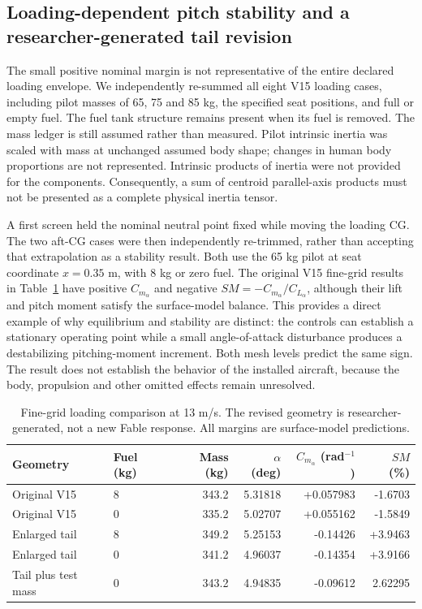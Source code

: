 \subsection{Loading-dependent pitch stability and a researcher-generated tail revision}
\label{sec:tail-loading-revision}

The small positive nominal margin is not representative of the entire declared
loading envelope. We independently re-summed all eight V15 loading cases,
including pilot masses of 65, 75 and 85 kg, the specified seat positions, and
full or empty fuel. The fuel tank structure remains present when its fuel is
removed. The mass ledger is still assumed rather than measured. Pilot intrinsic
inertia was scaled with mass at unchanged assumed body shape; changes in human
body proportions are not represented. Intrinsic products of inertia were not
provided for the components. Consequently, a sum of centroid parallel-axis
products must not be presented as a complete physical inertia tensor.

A first screen held the nominal neutral point fixed while moving the loading
CG. The two aft-CG cases were then independently re-trimmed, rather than accepting
that extrapolation as a stability result. Both use the 65 kg pilot at seat
coordinate $x=0.35$ m, with 8 kg or zero fuel. The original V15 fine-grid results
in Table~\ref{tab:tail-loading} have positive $C_{m_\alpha}$ and negative
$SM=-C_{m_\alpha}/C_{L_\alpha}$, although their lift and pitch moment satisfy
the surface-model balance. This provides a direct example of why equilibrium
and stability are distinct: the controls can establish a stationary operating
point while a small angle-of-attack disturbance produces a destabilizing
pitching-moment increment. Both mesh levels predict the same sign. The result
does not establish the behavior of the installed aircraft, because the body,
propulsion and other omitted effects remain unresolved.

\begin{table}[htbp]
\centering\small
\caption{Fine-grid loading comparison at 13 m/s. The revised geometry is researcher-generated, not a new Fable response. All margins are surface-model predictions.}
\label{tab:tail-loading}
\begin{tabular}{llrrrr}
\toprule
Geometry & Fuel (kg) & Mass (kg) & $\alpha$ (deg) & $C_{m_\alpha}$ (rad$^{-1}$) & $SM$ (\%)\\
\midrule
Original V15 & 8 & 343.2 & 5.31818 & +0.057983 & -1.6703\\
Original V15 & 0 & 335.2 & 5.02707 & +0.055162 & -1.5849\\
Enlarged tail & 8 & 349.2 & 5.25153 & -0.14426 & +3.9463\\
Enlarged tail & 0 & 341.2 & 4.96037 & -0.14354 & +3.9166\\
Tail plus test mass & 0 & 343.2 & 4.94835 & -0.09612 & 2.62295\\
\bottomrule
\end{tabular}
\end{table}

